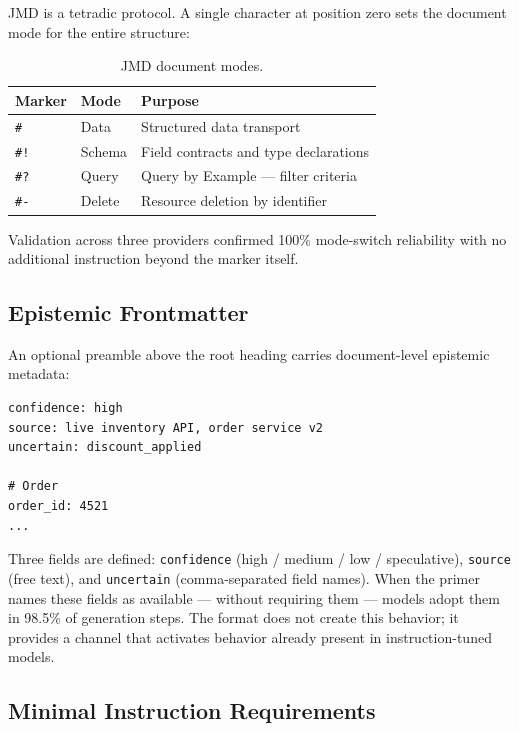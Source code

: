 \documentclass[11pt]{article}
\begin{document}
JMD is a tetradic protocol. A single character at position zero sets the document mode for the entire structure:

\begin{table}[h]
  \centering
  \footnotesize
  \begin{tabular}{llp{3.2cm}}
    \toprule
    \textbf{Marker} & \textbf{Mode} & \textbf{Purpose}                      \\
    \midrule
    \texttt{\#}     & Data          & Structured data transport             \\
    \texttt{\#!}    & Schema        & Field contracts and type declarations \\
    \texttt{\#?}    & Query         & Query by Example --- filter criteria  \\
    \texttt{\#-}    & Delete        & Resource deletion by identifier       \\
    \bottomrule
  \end{tabular}
  \caption{JMD document modes.}
\end{table}

Validation across three providers confirmed 100\% mode-switch reliability with no additional instruction beyond the marker itself.

\subsection{Epistemic Frontmatter}

An optional preamble above the root heading carries document-level epistemic metadata:

\begin{lstlisting}
confidence: high
source: live inventory API, order service v2
uncertain: discount_applied

# Order
order_id: 4521
...
\end{lstlisting}

Three fields are defined: \texttt{confidence} (high / medium / low / speculative), \texttt{source} (free text), and \texttt{uncertain} (comma-separated field names). When the primer names these fields as available --- without requiring them --- models adopt them in 98.5\% of generation steps. The format does not create this behavior; it provides a channel that activates behavior already present in instruction-tuned models.

\subsection{Minimal Instruction Requirements}
\end{document}
